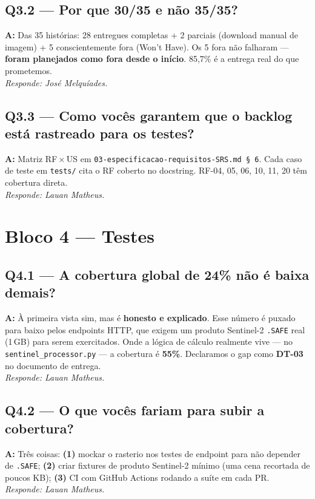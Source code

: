 \documentclass[12pt,a4paper]{article}
\begin{document}
\subsection*{Q3.2 — Por que 30/35 e não 35/35?}
\textbf{A:} Das 35 histórias: 28 entregues completas + 2 parciais
(download manual de imagem) + 5 conscientemente fora (Won't Have). Os 5
fora não falharam — \textbf{foram planejados como fora desde o início}.
85,7\% é a entrega real do que prometemos.
\\[2pt] \textit{Responde: José Melquíades.}

\subsection*{Q3.3 — Como vocês garantem que o backlog está rastreado para os testes?}
\textbf{A:} Matriz RF\,×\,US em \texttt{03-especificacao-requisitos-SRS.md
§\,6}. Cada caso de teste em \texttt{tests/} cita o RF coberto no docstring.
RF-04, 05, 06, 10, 11, 20 têm cobertura direta.
\\[2pt] \textit{Responde: Lauan Matheus.}

\section*{Bloco 4 — Testes}

\subsection*{Q4.1 — A cobertura global de 24\% não é baixa demais?}
\textbf{A:} À primeira vista sim, mas é \textbf{honesto e explicado}. Esse
número é puxado para baixo pelos endpoints HTTP, que exigem um produto
Sentinel-2 \texttt{.SAFE} real (1\,GB) para serem exercitados. Onde a lógica
de cálculo realmente vive — no \texttt{sentinel\_processor.py} — a cobertura
é \textbf{55\%}. Declaramos o gap como \textbf{DT-03} no documento de entrega.
\\[2pt] \textit{Responde: Lauan Matheus.}

\subsection*{Q4.2 — O que vocês fariam para subir a cobertura?}
\textbf{A:} Três coisas: \textbf{(1)} mockar o rasterio nos testes de
endpoint para não depender de \texttt{.SAFE}; \textbf{(2)} criar fixtures de
produto Sentinel-2 mínimo (uma cena recortada de poucos KB);
\textbf{(3)} CI com GitHub Actions rodando a suíte em cada PR.
\\[2pt] \textit{Responde: Lauan Matheus.}
\end{document}
